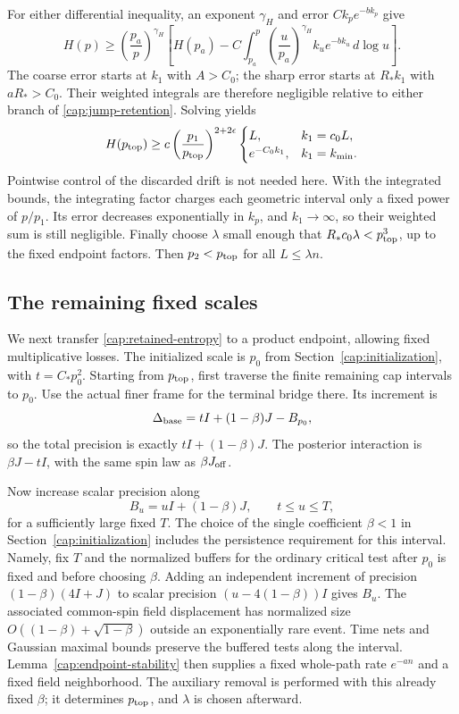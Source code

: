 For either differential inequality, an exponent $\gamma_H$ and error
$Ck_pe^{-bk_p}$ give
\[
 H(p)\ge\left(\frac{p_a}{p}\right)^{\gamma_H}
 \left[H(p_a)-C\int_{p_a}^{p}
   \left(\frac{u}{p_a}\right)^{\gamma_H}
   k_u e^{-bk_u}\,d\log u\right].
\]
The coarse error starts at $k_1$ with $A>C_0$; the sharp error starts at
$R_*k_1$ with $aR_*>C_0$. Their weighted integrals are therefore negligible
relative to either branch of \eqref{cap:jump-retention}. Solving yields
\begin{equation}\label{cap:retained-entropy}
 H(p_{\rm top})\ge
 c\left(\frac{p_1}{p_{\rm top}}\right)^{2+2\epsilon}
 \begin{cases}
 L,& k_1=c_0L,\\
 e^{-C_0k_1},& k_1=k_{\min}.
 \end{cases}
\end{equation}
Pointwise control of the discarded drift is not needed here. With the
integrated bounds, the integrating factor charges each geometric interval only
a fixed power of $p/p_1$. Its error decreases exponentially in $k_p$, and
$k_1\to\infty$, so their weighted sum is still negligible. Finally choose
$\lambda$ small enough that $R_*c_0\lambda<p_{\rm top}^3$, up to the fixed
endpoint factors. Then $p_2<p_{\rm top}$ for all $L\le\lambda n$.

\subsection{The remaining fixed scales}\label{cap:constant-scales}

We next transfer \eqref{cap:retained-entropy} to a product endpoint, allowing
fixed multiplicative losses. The initialized scale is $p_0$ from
Section~\ref{cap:initialization}, with $t=C_*p_0^2$. Starting from
$p_{\rm top}$, first traverse the finite remaining cap intervals to $p_0$.
Use the actual finer frame for the terminal bridge there. Its increment is
\[
 \Delta_{\rm base}=tI+(1-\beta)J-B_{p_0},
\]
so the total precision is exactly $tI+(1-\beta)J$. The posterior interaction
is $\beta J-tI$, with the same spin law as $\beta J_{\rm off}$.

Now increase scalar precision along
\[
 B_u=uI+(1-\beta)J,\qquad t\le u\le T,
\]
for a sufficiently large fixed $T$. The choice of the single coefficient
$\beta<1$ in Section~\ref{cap:initialization} includes the persistence
requirement for this interval. Namely, fix $T$ and the normalized buffers
for the ordinary critical test after $p_0$ is fixed and before choosing
$\beta$. Adding an independent increment of precision
$(1-\beta)(4I+J)$ to scalar precision $(u-4(1-\beta))I$ gives $B_u$.
The associated common-spin field displacement has normalized size
$O((1-\beta)+\sqrt{1-\beta})$ outside an exponentially rare event.
Time nets and Gaussian maximal bounds preserve the buffered tests along the
interval. Lemma~\ref{cap:endpoint-stability} then supplies a fixed
whole-path rate $e^{-an}$ and a fixed field neighborhood.
The auxiliary removal is performed with this already fixed $\beta$;
it determines $p_{\rm top}$, and $\lambda$ is chosen afterward.

